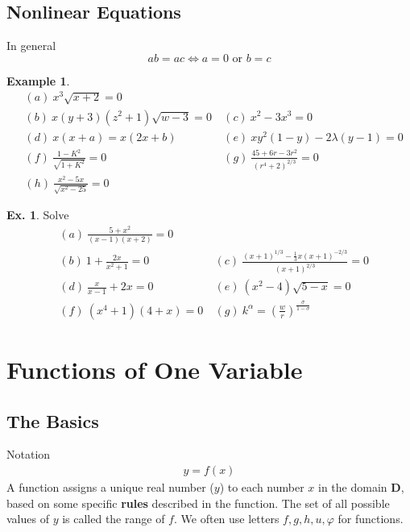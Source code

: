 \documentclass[10pt,a4paper]{book}
\theoremstyle{definition}\newtheorem{definition}{Definition}
\theoremstyle{definition}\newtheorem{fact}{Fact}
\theoremstyle{definition}\newtheorem{ex}{Ex.}
\theoremstyle{definition}\newtheorem{project}{Project}
\theoremstyle{definition}\newtheorem{problem}{Problem}
\theoremstyle{definition}\newtheorem{example}{Example}
\numberwithin{theorem}{chapter}
\numberwithin{corollary}{chapter}
\numberwithin{assumption}{chapter}
\numberwithin{definition}{chapter}
\numberwithin{prop}{chapter}
\numberwithin{notation}{chapter}
\numberwithin{problem}{chapter}
\numberwithin{example}{chapter}
\numberwithin{fact}{chapter}
\numberwithin{ex}{chapter}
\def\D{\mathbf D}
\begin{document}
	\section{Nonlinear Equations}
	In general
	\begin{equation*}
		ab = ac \Leftrightarrow a = 0 \text{ or } b = c
	\end{equation*}
	\begin{example}
		\begin{align*}
			& (a) \ x^3\sqrt{x+2} = 0                        \\
			& (b) \ x(y+3)(z^2 +1)\sqrt{w-3} = 0 \           
			& (c) \ x^2 - 3x^3 = 0                           \\
			& (d) \ x(x+a) = x(2x+b) \                       
			& (e) \ x y^2(1-y) - 2\lambda (y-1) = 0          \\
			& (f) \ \frac{1-K^2}{\sqrt{1+K^2}} = 0 \         
			& (g) \ \frac{45 + 6r - 3r^2}{(r^4+2)^{2/3}} = 0 \\
			& (h) \ \frac{x^2 - 5x}{\sqrt{x^2 - 25}} = 0     
		\end{align*}
	\end{example}
	
	\begin{ex}
		Solve
		\begin{align*}
			& (a) \ \frac{5+x^2}{(x-1)(x+2)} = 0                                        \\
			& (b) \ 1 + \frac{2x}{x^2 + 1} = 0 \                                        
			& (c) \ \frac{(x+1)^{1/3} - \frac{1}{3} x (x+1)^{-2/3} }{ (x+1)^{2/3} } = 0 \\
			& (d) \ \frac{x}{x-1} + 2x = 0 \                                            
			& (e) \ (x^2-4)\sqrt{5-x} = 0                                               \\
			& (f) \ (x^4+1)(4+x) = 0 \                                                  
			& (g) \ k^{\alpha} = \left( \frac{w}{r} \right)^{\frac{\sigma}{1-\sigma}}   
		\end{align*}
	\end{ex}
	
	\chapter{Functions of One Variable}
	\section{The Basics}
	Notation
	\begin{align*}
		y = f(x) 
	\end{align*}
	A function assigns a unique real number ($y$) to each number $x$ in the domain $\D$, based on some specific \textbf{rules} described in the function. The set of all possible values of $y$ is called the range of $f$. We often use letters $f, g, h, u, \varphi$ for functions.
	
\end{document}
